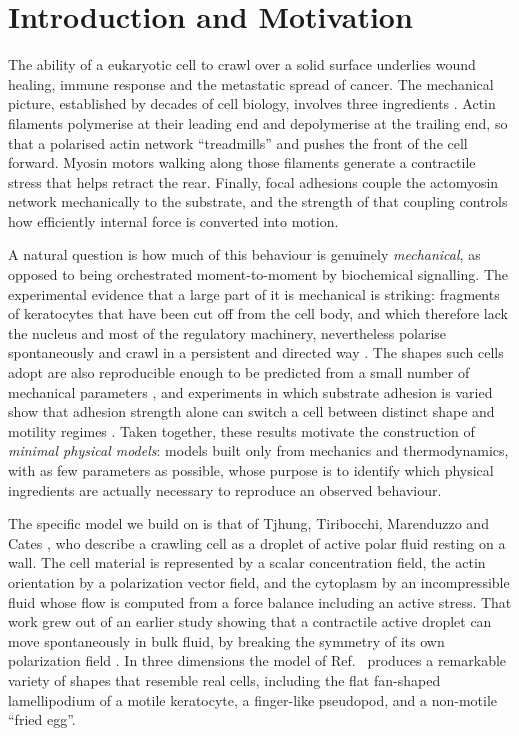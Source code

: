 \documentclass[11pt]{article}
\begin{document}
\section{Introduction and Motivation}
\label{sec:intro}

\noindent
The ability of a eukaryotic cell to crawl over a solid surface underlies wound
healing, immune response and the metastatic spread of cancer. The mechanical
picture, established by decades of cell biology, involves three ingredients
\cite{Bray:2000}. Actin filaments polymerise at their leading end and
depolymerise at the trailing end, so that a polarised actin network
``treadmills'' and pushes the front of the cell forward. Myosin motors walking
along those filaments generate a contractile stress that helps retract the rear.
Finally, focal adhesions couple the actomyosin network mechanically to the
substrate, and the strength of that coupling controls how efficiently internal
force is converted into motion.

A natural question is how much of this behaviour is genuinely
\textit{mechanical}, as opposed to being orchestrated moment-to-moment by
biochemical signalling. The experimental evidence that a large part of it is
mechanical is striking: fragments of keratocytes that have been cut off from the
cell body, and which therefore lack the nucleus and most of the regulatory
machinery, nevertheless polarise spontaneously and crawl in a persistent and
directed way \cite{Verkhovsky:1999}. The shapes such cells adopt are also
reproducible enough to be predicted from a small number of mechanical parameters
\cite{Keren:2008}, and experiments in which substrate adhesion is varied show
that adhesion strength alone can switch a cell between distinct shape and
motility regimes \cite{Barnhart:2011}. Taken together, these results motivate the
construction of \textit{minimal physical models}: models built only from
mechanics and thermodynamics, with as few parameters as possible, whose purpose
is to identify which physical ingredients are actually necessary to reproduce an
observed behaviour.

The specific model we build on is that of Tjhung, Tiribocchi, Marenduzzo and
Cates \cite{Tjhung:2015}, who describe a crawling cell as a droplet of active
polar fluid resting on a wall. The cell material is represented by a scalar
concentration field, the actin orientation by a polarization vector field, and
the cytoplasm by an incompressible fluid whose flow is computed from a force
balance including an active stress. That work grew out of an earlier study
showing that a contractile active droplet can move spontaneously in bulk fluid,
by breaking the symmetry of its own polarization field \cite{Tjhung:2012}. In
three dimensions the model of Ref.~\cite{Tjhung:2015} produces a remarkable
variety of shapes that resemble real cells, including the flat fan-shaped
lamellipodium of a motile keratocyte, a finger-like pseudopod, and a
non-motile ``fried egg''.
\end{document}
